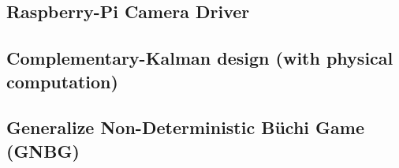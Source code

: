 \documentclass[ twoside, 12pt ]{article}
\newcommand{\commentOut}[1]{}
\begin{document}
\subsection{Raspberry-Pi Camera Driver}
\subsection{Complementary-Kalman design (with physical computation)}
\subsection{Generalize Non-Deterministic B\"uchi Game (GNBG)}
\label{sec:GNBG}




\commentOut{
\section{Architecture: Automata Base Scheduler (From proposal)}

As describe in Section~\ref{sec:Problem} control systems have two main parts: \textit{state estimation} and \textit{controller}. 
The common used techniques for controllers, e.g PID, are relatively low resources consumers and there is no real justification of optimizing it, but this is not always the case for estimation process, some times there are heavy computational tasks as part of state estimation task, this refers to both the estimator and sensing stage.
The sensor can be complex computations of Global Positioning System (GPS) in small processor or even camera with heavy computer vision.
Those sensing task need to run in real-time and can interfere with rest of the system tasks.
In our architecture we concentrate more in those heavy sensing processes in order to improve the resource utilization and control performance.
(See~\ref{state estimation & why choose the window mission})

\commentOut{ %
    
}}
\end{document}

